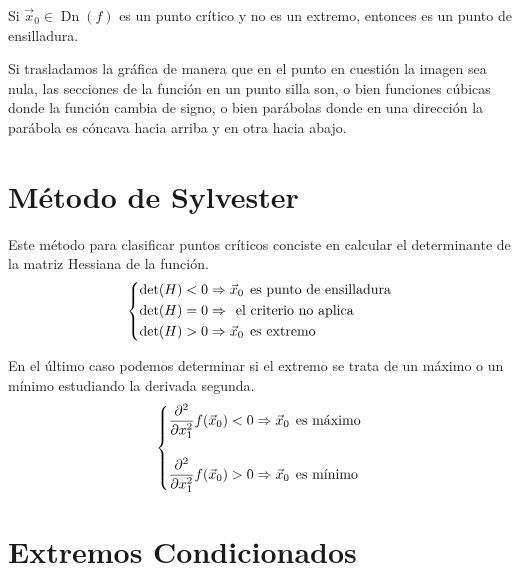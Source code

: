 \documentclass[a5paper,12pt,twoside]{book}
\begin{document}
Si $\Vec{x}_0 \in \operatorname{Dn}(f)$ es un punto crítico y no es un extremo, entonces es un punto de ensilladura.

Si trasladamos la gráfica de manera que en el punto en cuestión la imagen sea nula, las secciones de la función en un punto silla son, o bien funciones cúbicas donde la función cambia de signo, o bien parábolas donde en una dirección la parábola es cóncava hacia arriba y en otra hacia abajo.


\section{Método de Sylvester}

Este método para clasificar puntos críticos conciste en calcular el determinante de la matriz Hessiana de la función.
\begin{equation*}
    \left\{
    \begin{aligned}
        \operatorname{det}(H) < 0 & \Rightarrow \Vec{x}_0 \hspace{1ex} \textrm{es punto de ensilladura}
        \\
        \operatorname{det}(H) = 0 &\Rightarrow \hspace{1ex} \textrm{el criterio no aplica}
        \\
        \operatorname{det}(H) > 0 &\Rightarrow \Vec{x}_0 \hspace{1ex} \textrm{es extremo}
    \end{aligned}
    \right.
\end{equation*}

En el último caso podemos determinar si el extremo se trata de un máximo o un mínimo estudiando la derivada segunda.
\begin{equation*}
    \left\{
    \begin{aligned}
        \frac{\partial^2}{\partial x_1^2} f(\Vec{x}_0) < 0 &\Rightarrow \Vec{x}_0 \hspace{1ex} \textrm{es máximo}
        \\[1em]
        \frac{\partial^2}{\partial x_1^2} f(\Vec{x}_0) > 0 &\Rightarrow \Vec{x}_0 \hspace{1ex} \textrm{es mínimo}
    \end{aligned}
    \right.
\end{equation*}


\section{Extremos Condicionados}
\end{document}
